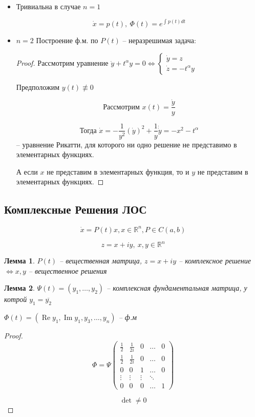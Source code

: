 \documentclass[a4paper]{article}
\theoremstyle{indented}
\newtheorem*{lemma}{Лемма}
\theoremstyle{definition}
\theoremstyle{remark}
\DeclareMathOperator{\Imf}{Im}
\DeclareMathOperator{\Real}{Re}
\begin{document}
\begin{itemize}
\item 
Тривиальна в случае $n = 1$

\[\dot x = p(t), \ \Phi(t) = e^{\int_{}^{}p(t)dt}\]

\item 
$n = 2$ Построение ф.м. по $P(t)$ --  неразрешимая задача:

\begin{proof}
Рассмотрим уравнение $\ddot y + t^{\alpha}y = 0 \Leftrightarrow  \begin{cases}\dot y = z \\ \dot z = -t^{\alpha}y \end{cases}$

Предположим $y(t) \not \equiv 0$

\[ \text{Рассмотрим }x(t) = \frac{\dot y}{y}\]

\[\text{Тогда } \dot x = - \frac{1}{y^2}(\dot y)^2 + \frac{1}{y} \dot \dot y = -x^2 - t^{\alpha}\] -- уравнение Рикатти, для которого ни одно решение не представимо в элементарных функциях.

А если $x$ не представим в элементарных функция, то и $y$ не представим в элементарных функциях.
\end{proof}

\end{itemize}
\subsection{Комплексные Решения ЛОС}

\[\dot x = P(t) x, x \in \mathbb{R}^n, P \in C(a,b)\]

\[z = x + iy, \ x,y \in \mathbb{R}^n\]

\begin{lemma}
  $P(t)$ -- вещественная матрица, $z = x + iy$ -- комплексное решение $  \Leftrightarrow x,y$ -- вещественное решения
  
\end{lemma}

\begin{lemma}

  $\Psi(t) = (y_1, \ldots, y_2)$ -- комплексная фундаментальная матрица, у котрой $y_1 = \overline{y_2}$ 

  $\Phi(t) = (\Real y_1, \Imf y_1, y_3, \ldots, y_n)$ -- ф.м

  
\end{lemma}
\begin{proof}
  \[\Phi = \Psi \begin{pmatrix}
    \frac{1}{2} & \frac{1}{2i} & 0 & \ldots & 0 \\
    \frac{1}{2} & \frac{1}{2i} & 0 & \ldots &0 \\
    0 & 0 &1 &\ldots& 0 \\
    \vdots & \vdots &\vdots  & \ddots &\\
    0 & 0 & 0 & \ldots & 1
    
  \end{pmatrix}\]

  \[\det \neq 0\]
\end{proof}
\end{document}
